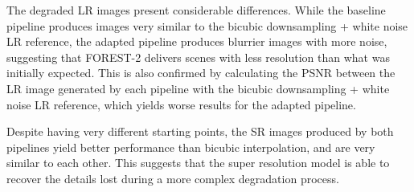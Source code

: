         The degraded LR images present considerable differences. While the baseline pipeline produces images very similar to the bicubic downsampling + white noise LR reference,
        the adapted pipeline produces blurrier images with more noise, suggesting that FOREST-2 delivers scenes with less resolution than what was initially expected. 
        This is also confirmed by calculating the PSNR between the LR image generated by each pipeline with the bicubic downsampling + white noise LR reference, which yields worse results for the adapted pipeline.
        
        Despite having very different starting points, the SR images produced by both pipelines yield better performance than bicubic interpolation, and are very similar to each other. This suggests that the super resolution model is able to recover the details lost during a more complex degradation process.

